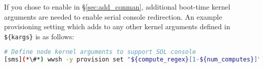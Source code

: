 If you chose to enable \conman{} in \S\ref{sec:add_conman}, additional
boot-time kernel arguments are needed to enable serial console
redirection. An example provisioning setting which adds to any other kernel arguments defined
in \texttt{\$\{kargs\}} is as follows:

\begin{lstlisting}[language=bash,keywords={},upquote=true]
# Define node kernel arguments to support SOL console
[sms](*\#*) wwsh -y provision set "${compute_regex}[1-${num_computes}]" --kargs "${kargs} console=ttyS1,115200"
\end{lstlisting}
